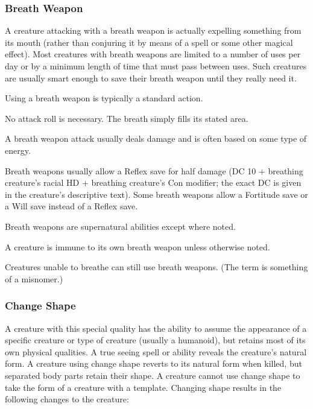 \subsubsection{Breath Weapon}
A creature attacking with a breath weapon is actually expelling something from its mouth (rather than conjuring it by means of a spell or some other magical effect). Most creatures with breath weapons are limited to a number of uses per day or by a minimum length of time that must pass between uses. Such creatures are usually smart enough to save their breath weapon until they really need it.

\begin{itemize*}
\item Using a breath weapon is typically a standard action.
\item No attack roll is necessary. The breath simply fills its stated area.
\item A breath weapon attack usually deals damage and is often based on some type of energy.
\item Breath weapons usually allow a Reflex save for half damage (DC 10 + \onehalf breathing creature's racial HD + breathing creature's Con modifier; the exact DC is given in the creature's descriptive text). Some breath weapons allow a Fortitude save or a Will save instead of a Reflex save.
\item Breath weapons are supernatural abilities except where noted.
\item A creature is immune to its own breath weapon unless otherwise noted.
\item Creatures unable to breathe can still use breath weapons. (The term is something of a misnomer.)
\end{itemize*}

\subsubsection{Change Shape}
A creature with this special quality has the ability to assume the appearance of a specific creature or type of creature (usually a humanoid), but retains most of its own physical qualities. A true seeing spell or ability reveals the creature's natural form. A creature using change shape reverts to its natural form when killed, but separated body parts retain their shape. A creature cannot use change shape to take the form of a creature with a template. Changing shape results in the following changes to the creature:

